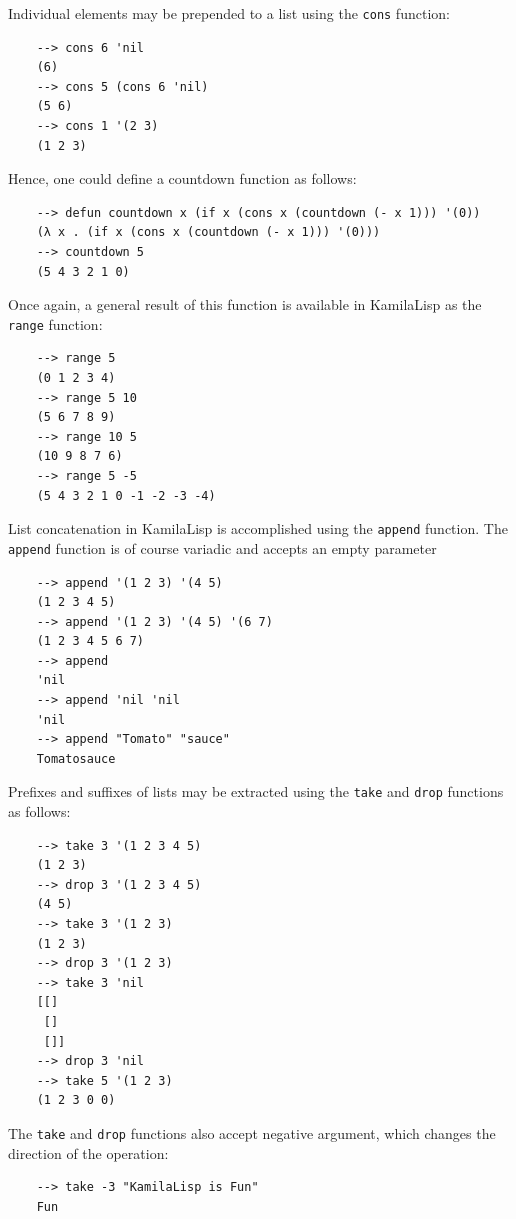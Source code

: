 Individual elements may be prepended to a list using the \verb|cons| function:

\begin{Verbatim}
    --> cons 6 'nil
    (6)
    --> cons 5 (cons 6 'nil)
    (5 6)
    --> cons 1 '(2 3)
    (1 2 3)
\end{Verbatim}

Hence, one could define a countdown function as follows:

\begin{Verbatim}
    --> defun countdown x (if x (cons x (countdown (- x 1))) '(0))
    (λ x . (if x (cons x (countdown (- x 1))) '(0)))
    --> countdown 5
    (5 4 3 2 1 0)
\end{Verbatim}

Once again, a general result of this function is available in KamilaLisp as the \verb|range| function:

\begin{Verbatim}
    --> range 5
    (0 1 2 3 4)
    --> range 5 10
    (5 6 7 8 9)
    --> range 10 5
    (10 9 8 7 6)
    --> range 5 -5
    (5 4 3 2 1 0 -1 -2 -3 -4)
\end{Verbatim}

List concatenation in KamilaLisp is accomplished using the \verb|append| function. The \verb|append| function is of course variadic and accepts an empty parameter 

\begin{Verbatim}
    --> append '(1 2 3) '(4 5)
    (1 2 3 4 5)
    --> append '(1 2 3) '(4 5) '(6 7)
    (1 2 3 4 5 6 7)
    --> append
    'nil
    --> append 'nil 'nil
    'nil
    --> append "Tomato" "sauce"
    Tomatosauce
\end{Verbatim}

Prefixes and suffixes of lists may be extracted using the \verb|take| and \verb|drop| functions as follows:

\begin{Verbatim}
    --> take 3 '(1 2 3 4 5)
    (1 2 3)
    --> drop 3 '(1 2 3 4 5)
    (4 5)
    --> take 3 '(1 2 3)
    (1 2 3)
    --> drop 3 '(1 2 3)
    --> take 3 'nil
    [[]
     []
     []]
    --> drop 3 'nil
    --> take 5 '(1 2 3)
    (1 2 3 0 0)
\end{Verbatim}

The \verb|take| and \verb|drop| functions also accept negative argument, which changes the direction of the operation:

\begin{Verbatim}
    --> take -3 "KamilaLisp is Fun"
    Fun
\end{Verbatim}

